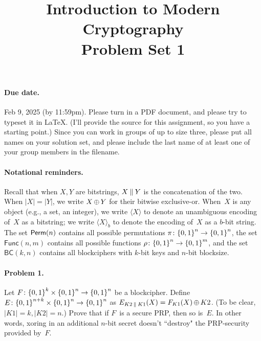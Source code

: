 \documentclass[11pt]{article}
\title{{\bf  Introduction to Modern Cryptography}\\ Problem Set 1 \\[2ex] }
\date{}
\author{}
\newcommand{\Func}{\mathsf{Func}}
\begin{document}
\maketitle
\thispagestyle{empty}

\paragraph{Due date.} Feb 9, 2025 (by 11:59pm).  Please turn in a PDF
document, and please try to typeset it in LaTeX.  (I'll provide the
source for this assignment, so you have a starting point.)
Since you can work in groups of up to size three, please put all names on your solution
set, and please include the last name of at least one of your group members in the filename.

\paragraph{Notational reminders.}  Recall that when $X,Y$ are
bitstrings, $X \:\|\: Y$ is the concatenation of the two.   When
$|X|=|Y|$, we write $X {\,\oplus\,} Y$ for their bitwise exclusive-or.  When~$X$ is any object (e.g., a set, an integer), we write $\langle X \rangle$ to denote an unambiguous encoding of~$X$ as a bitstring; we write $\langle X \rangle_b$ to denote the encoding of~$X$ as a $b$-bit string.  The set $\mathsf{Perm}({n})$ contains all possible permutations $\pi\colon{\{0,1\}}^n \to {\{0,1\}}^n$, the set $\Func(n,m)$ contains all possible functions $\rho\colon{\{0,1\}}^n \to {\{0,1\}}^m$, and the set $\mathsf{BC}(k,n)$ contains all blockciphers with $k$-bit keys and $n$-bit blocksize.



\paragraph{Problem 1.} Let $F\colon{\{0,1\}}^k \times {\{0,1\}}^n \to {\{0,1\}}^n$ be a blockcipher.  Define $E\colon {\{0,1\}}^{n+k} \times {\{0,1\}}^n \to {\{0,1\}}^n$ as $E_{K2 \:\|\: K1}(X) = F_{K1}(X) {\,\oplus\,} K2$.  (To be clear, $|K1|= k, |K2|=n$.) Prove that if $F$~is a secure PRP, then so is~$E$.  In other words, xoring in an additional $n$-bit secret doesn't ``destroy" the PRP-security provided by~$F$.
\end{document}
